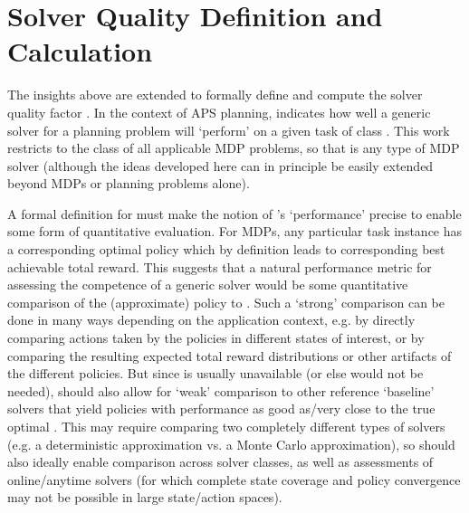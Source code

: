 \section{Solver Quality Definition and Calculation} \label{sec:SQ}


The insights above are extended to formally define and compute the solver quality \famsec{} factor \xQ{}. In the context of APS planning, \xQ{} indicates how well a generic solver \solve{} for a planning problem will `perform' on a given task \task{} of class \taskclass{}. This work restricts \taskclass{} to the class of all applicable MDP problems, so that \solve{} is any type of MDP solver  (although the ideas developed here can in principle be easily extended beyond MDPs or planning problems alone). %


A formal definition for \xQ{} must make the notion of \solve{}'s `performance' precise to enable some form of quantitative evaluation. For MDPs, any particular task instance \task{} has a corresponding optimal policy \piopt{} which by definition leads to corresponding best achievable total reward. This suggests that a natural performance metric for assessing the competence of a generic solver \solve{} would be some quantitative comparison of the (approximate) policy \piapprox{} to \piopt. Such a `strong' comparison can be done in many ways depending on the application context, e.g. by directly comparing actions taken by the policies in different states of interest, or by comparing the resulting expected total reward distributions or other artifacts of the different policies. 
But since \piopt{} is usually unavailable (or else \solve{} would not be needed), \xQ{} should also allow for `weak' comparison to other reference `baseline' solvers that yield policies with performance as good as/very close to the true optimal \piopt. This may require comparing two completely different types of solvers (e.g. a deterministic approximation vs. a Monte Carlo approximation), so \xQ{} should also ideally enable comparison across solver classes, as well as assessments of online/anytime solvers (for which complete state coverage and policy convergence may not be possible in large state/action spaces). %

